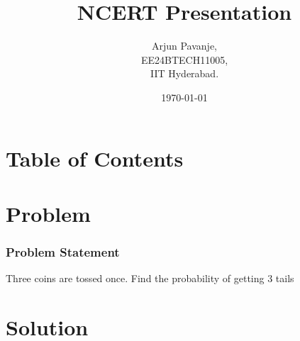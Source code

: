 \documentclass{beamer}
\title{NCERT Presentation}
\author{Arjun Pavanje,\\ EE24BTECH11005,\\IIT Hyderabad.\\}
\date{\today}
\theoremstyle{remark}
\numberwithin{equation}{section}
\begin{document}
    \begin{frame}
      \titlepage
    \end{frame}

    \section*{Table of Contents}
    \begin{frame}
      \tableofcontents
    \end{frame}
    \section{Problem}
    \begin{frame}
      \frametitle{Problem Statement}
      Three coins are tossed once. Find the probability of getting 3 tails 
    \end{frame}
    \section{Solution}
\end{document}
